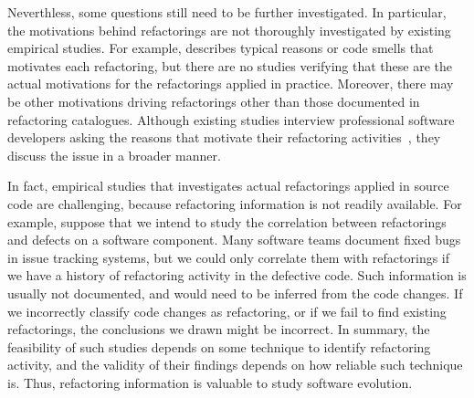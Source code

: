 Neverthless, some questions still need to be further investigated.
In particular, the motivations behind refactorings are not thoroughly investigated by existing empirical studies.
For example, \cite{Fowler:1999} describes typical reasons or code smells that motivates each refactoring, but there are no studies verifying that these are the actual motivations for the refactorings applied in practice.
Moreover, there may be other motivations driving refactorings other than those  documented in refactoring catalogues.
Although existing studies interview professional software developers asking the reasons that motivate their refactoring activities~\citep{kim-tse-2014, Wang:2009}, they discuss the issue in a broader manner.

In fact, empirical studies that investigates actual refactorings applied in source code are challenging, because refactoring information is not readily available.
For example, suppose that we intend to study the correlation between refactorings and defects on a software component. 
Many software teams document fixed bugs in issue tracking systems, but we could only correlate them with refactorings if we have a history of refactoring activity in the defective code.
Such information is usually not documented, and would need to be inferred from the code changes.
If we incorrectly classify code changes as refactoring, or if we fail to find existing refactorings, the conclusions we drawn might be incorrect.
In summary, the feasibility of such studies depends on some technique to identify refactoring activity, and the validity of their findings depends on how reliable such technique is.
Thus, refactoring information is valuable to study software evolution.

